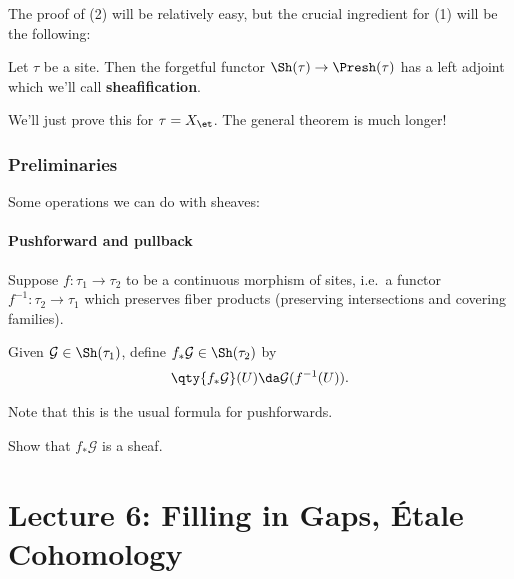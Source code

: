 The proof of (2) will be relatively easy, but the crucial ingredient for
(1) will be the following:

\begin{theorem}[?]

Let \(\tau\) be a site. Then the forgetful functor
\(\Sh(\tau) \to \Presh(\tau)\) has a left adjoint which we'll call
\textbf{sheafification}.

\end{theorem}

We'll just prove this for \(\tau = X_{\et}\). The general theorem is
much longer!

\hypertarget{preliminaries}{%
\subsubsection{Preliminaries}\label{preliminaries}}

Some operations we can do with sheaves:

\hypertarget{pushforward-and-pullback}{%
\paragraph{Pushforward and pullback}\label{pushforward-and-pullback}}

Suppose \(f:\tau_1 \to \tau_2\) to be a continuous morphism of sites,
i.e.~a functor \(f^{-1} : \tau_2 \to \tau_1\) which preserves fiber
products (preserving intersections and covering families).

\begin{definition}[Pushforwards]

Given \(\mathcal{G}\in \Sh(\tau_1)\), define
\(f_* \mathcal{G}\in \Sh(\tau_2)\) by
\begin{align*}  
\qty{f_* \mathcal{G}}(U) \da \mathcal{G}( f^{-1}(U))
.\end{align*}

\end{definition}

Note that this is the usual formula for pushforwards.

\begin{exercise}

Show that \(f_* \mathcal{G}\) is a sheaf.

\end{exercise}

\hypertarget{lecture-6-filling-in-gaps-uxe9tale-cohomology}{%
\section{Lecture 6: Filling in Gaps, Étale
Cohomology}\label{lecture-6-filling-in-gaps-uxe9tale-cohomology}}

